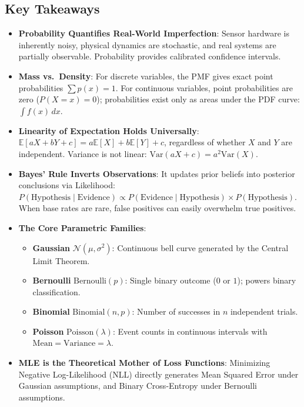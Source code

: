 \subsection{Key Takeaways}\label{subsec:prob_takeaways}

\begin{takeaways}
\begin{itemize}
    \item \textbf{Probability Quantifies Real-World Imperfection}: Sensor hardware is inherently noisy, physical dynamics are stochastic, and real systems are partially observable. Probability provides calibrated confidence intervals.
    \item \textbf{Mass vs.\ Density}: For discrete variables, the PMF gives exact point probabilities $\sum p(x) = 1$. For continuous variables, point probabilities are zero ($P(X = x) = 0$); probabilities exist only as areas under the PDF curve: $\int f(x)\,dx$.
    \item \textbf{Linearity of Expectation Holds Universally}: $\mathbb{E}[aX + bY + c] = a\mathbb{E}[X] + b\mathbb{E}[Y] + c$, regardless of whether $X$ and $Y$ are independent. Variance is not linear: $\text{Var}(aX + c) = a^2 \text{Var}(X)$.
    \item \textbf{Bayes' Rule Inverts Observations}: It updates prior beliefs into posterior conclusions via Likelihood: $P(\text{Hypothesis} \mid \text{Evidence}) \propto P(\text{Evidence} \mid \text{Hypothesis}) \times P(\text{Hypothesis})$. When base rates are rare, false positives can easily overwhelm true positives.
    \item \textbf{The Core Parametric Families}:
    \begin{itemize}
        \item \textbf{Gaussian} $\mathcal{N}(\mu, \sigma^2)$: Continuous bell curve generated by the Central Limit Theorem.
        \item \textbf{Bernoulli} $\text{Bernoulli}(p)$: Single binary outcome ($0$ or $1$); powers binary classification.
        \item \textbf{Binomial} $\text{Binomial}(n, p)$: Number of successes in $n$ independent trials.
        \item \textbf{Poisson} $\text{Poisson}(\lambda)$: Event counts in continuous intervals with $\text{Mean} = \text{Variance} = \lambda$.
    \end{itemize}
    \item \textbf{MLE is the Theoretical Mother of Loss Functions}: Minimizing Negative Log-Likelihood (NLL) directly generates Mean Squared Error under Gaussian assumptions, and Binary Cross-Entropy under Bernoulli assumptions.
\end{itemize}
\end{takeaways}

